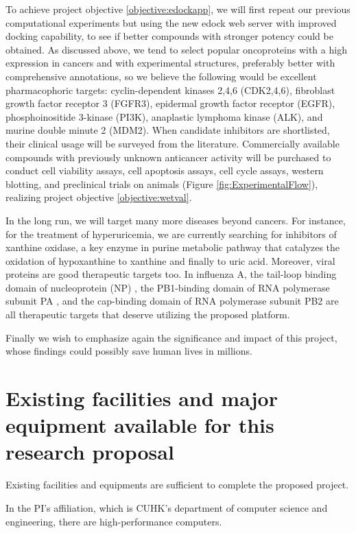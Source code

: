 \documentclass[a4paper,12pt]{article}
\begin{document}
To achieve project objective \ref{objective:edockapp}, we will first repeat our previous computational experiments but using the new edock web server with improved docking capability, to see if better compounds with stronger potency could be obtained. As discussed above, we tend to select popular oncoproteins with a high expression in cancers and with experimental structures, preferably better with comprehensive annotations, so we believe the following would be excellent pharmacophoric targets: cyclin-dependent kinases 2,4,6 (CDK2,4,6), fibroblast growth factor receptor 3 (FGFR3), epidermal growth factor receptor (EGFR), phosphoinositide 3-kinase (PI3K), anaplastic lymphoma kinase (ALK), and murine double minute 2 (MDM2). When candidate inhibitors are shortlisted, their clinical usage will be surveyed from the literature. Commercially available compounds with previously unknown anticancer activity will be purchased to conduct cell viability assays, cell apoptosis assays, cell cycle assays, western blotting, and preclinical trials on animals (Figure \ref{fig:ExperimentalFlow}), realizing project objective \ref{objective:wetval}.

In the long run, we will target many more diseases beyond cancers. For instance, for the treatment of hyperuricemia, we are currently searching for inhibitors of xanthine oxidase, a key enzyme in purine metabolic pathway that catalyzes the oxidation of hypoxanthine to xanthine and finally to uric acid. Moreover, viral proteins are good therapeutic targets too. In influenza A, the tail-loop binding domain of nucleoprotein (NP) \citep{1140,1231}, the PB1-binding domain of RNA polymerase subunit PA \citep{1540,1141}, and the cap-binding domain of RNA polymerase subunit PB2 \citep{1192} are all therapeutic targets that deserve utilizing the proposed platform.

Finally we wish to emphasize again the significance and impact of this project, whose findings could possibly save human lives in millions.

\section*{Existing facilities and major equipment available for this research proposal}

Existing facilities and equipments are sufficient to complete the proposed project.

In the PI's affiliation, which is CUHK's department of computer science and engineering, there are high-performance computers.
\end{document}
